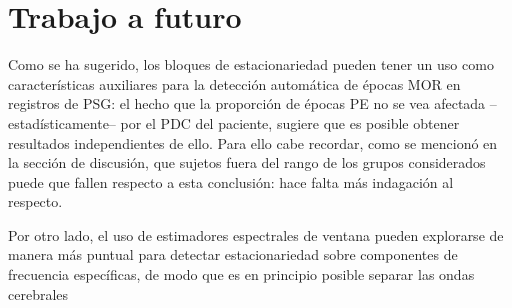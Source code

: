 
\section{Trabajo a futuro}

Como se ha sugerido, los bloques de estacionariedad pueden tener un uso como 
caracter\'isticas auxiliares
para la detecci\'on autom\'atica de \'epocas MOR en registros de PSG: el hecho que la proporci\'on
de \'epocas PE no se vea afectada --estad\'isticamente-- por el PDC del paciente, sugiere que es
posible obtener resultados independientes de ello. Para ello cabe recordar, como se mencion\'o 
en la secci\'on de discusi\'on, que sujetos fuera del rango de los grupos considerados puede
que fallen respecto a esta conclusi\'on: hace falta m\'as indagaci\'on al respecto. 

Por otro lado, el uso de estimadores espectrales de ventana pueden explorarse de manera m\'as
puntual para detectar estacionariedad sobre componentes de frecuencia espec\'ificas, de modo
que es en principio posible separar las ondas cerebrales 


